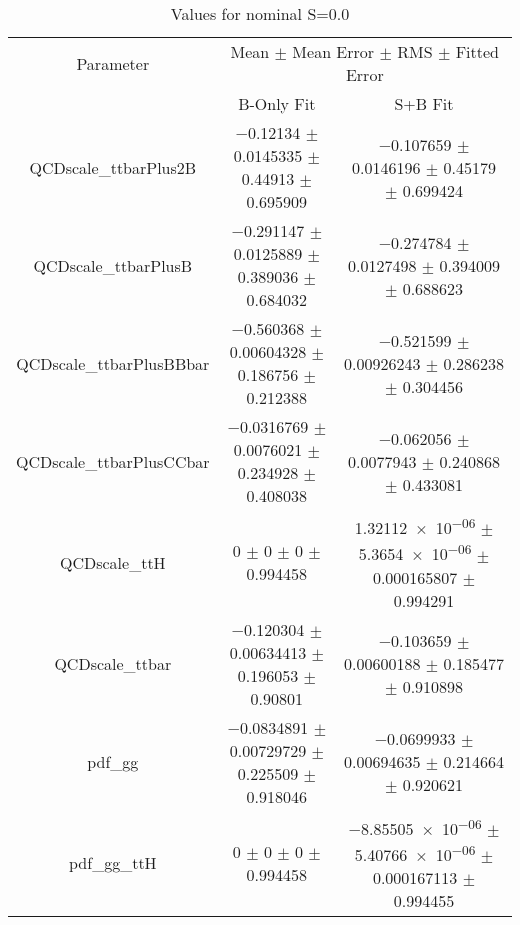 \begin{table}
\centering
\caption{Values for nominal S=0.0}
\begin{tabular}{ccc}
\toprule
Parameter & \multicolumn{2}{c}{Mean $\pm$ Mean Error $\pm$ RMS $\pm$ Fitted Error}\\
 & B-Only Fit & S+B Fit\\
\midrule
QCDscale\_ttbarPlus2B & \num{-0.12134} $\pm$ \num{0.0145335} $\pm$ \num{0.44913} $\pm$ \num{0.695909} & \num{-0.107659} $\pm$ \num{0.0146196} $\pm$ \num{0.45179} $\pm$ \num{0.699424}\\
QCDscale\_ttbarPlusB & \num{-0.291147} $\pm$ \num{0.0125889} $\pm$ \num{0.389036} $\pm$ \num{0.684032} & \num{-0.274784} $\pm$ \num{0.0127498} $\pm$ \num{0.394009} $\pm$ \num{0.688623}\\
QCDscale\_ttbarPlusBBbar & \num{-0.560368} $\pm$ \num{0.00604328} $\pm$ \num{0.186756} $\pm$ \num{0.212388} & \num{-0.521599} $\pm$ \num{0.00926243} $\pm$ \num{0.286238} $\pm$ \num{0.304456}\\
QCDscale\_ttbarPlusCCbar & \num{-0.0316769} $\pm$ \num{0.0076021} $\pm$ \num{0.234928} $\pm$ \num{0.408038} & \num{-0.062056} $\pm$ \num{0.0077943} $\pm$ \num{0.240868} $\pm$ \num{0.433081}\\
QCDscale\_ttH & \num{0} $\pm$ \num{0} $\pm$ \num{0} $\pm$ \num{0.994458} & \num{1.32112e-06} $\pm$ \num{5.3654e-06} $\pm$ \num{0.000165807} $\pm$ \num{0.994291}\\
QCDscale\_ttbar & \num{-0.120304} $\pm$ \num{0.00634413} $\pm$ \num{0.196053} $\pm$ \num{0.90801} & \num{-0.103659} $\pm$ \num{0.00600188} $\pm$ \num{0.185477} $\pm$ \num{0.910898}\\
pdf\_gg & \num{-0.0834891} $\pm$ \num{0.00729729} $\pm$ \num{0.225509} $\pm$ \num{0.918046} & \num{-0.0699933} $\pm$ \num{0.00694635} $\pm$ \num{0.214664} $\pm$ \num{0.920621}\\
pdf\_gg\_ttH & \num{0} $\pm$ \num{0} $\pm$ \num{0} $\pm$ \num{0.994458} & \num{-8.85505e-06} $\pm$ \num{5.40766e-06} $\pm$ \num{0.000167113} $\pm$ \num{0.994455}\\
\bottomrule
\end{tabular}
\end{table}